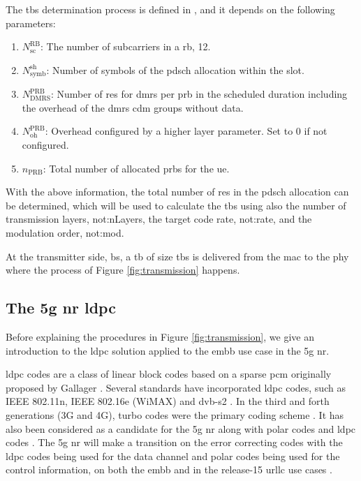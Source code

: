 The \gls{tbs} determination process is defined in \cite[Section 5.1.3.2]{3gpp.38.214}, and it depends on the following parameters:

\begin{enumerate}
    \item $N_{\text{sc}}^{\text{RB}}$: The number of subcarriers in a \gls{rb}, 12.
    \item $N_{\text{symb}}^{\text{sh}}$: Number of symbols of the \gls{pdsch} allocation within the slot.
    \item $N_{\text{DMRS}}^{\text{PRB}}$: Number of \glspl{re} for \gls{dmrs} per \gls{prb} in the scheduled duration including the overhead of the \gls{dmrs} \gls{cdm} groups without data.
    \item $N_{\text{oh}}^{\text{PRB}}$: Overhead configured by a higher layer parameter. Set to 0 if not configured.
    \item $n_{\text{PRB}}$: Total number of allocated \glspl{prb} for the \gls{ue}.
\end{enumerate}

With the above information, the total number of \glspl{re} in the \gls{pdsch} allocation can be determined, which will be used to calculate the \gls{tbs} using also the number of transmission layers, \gls{not:nLayers}, the target code rate, \gls{not:rate}, and the modulation order, \gls{not:mod}.

At the transmitter side, \gls{bs}, a \gls{tb} of size \gls{tbs} is delivered from the \gls{mac} to the \gls{phy} where the process of Figure \ref{fig:transmission} happens.



\subsection{The \gls{5g} \gls{nr} \gls{ldpc}}
\label{subsec:ldpc}

Before explaining the procedures in Figure \ref{fig:transmission}, we give an introduction to the \gls{ldpc} solution applied to the \gls{embb} use case in the \gls{5g} \gls{nr}.
%

\Gls{ldpc} codes are a class of linear block codes based on a sparse \gls{pcm}  originally proposed by Gallager \cite{gallager1962}.
%
Several standards have incorporated \gls{ldpc} codes, such as IEEE 802.11n, IEEE 802.16e (WiMAX) and \gls{dvb-s2} \cite{AliZaidi632018}.
%
In the third and forth generations (3G and 4G), turbo codes were the primary coding scheme \cite{Richardson2018}.
%
It has also been considered as a candidate for the \gls{5g} \gls{nr} along with polar codes and \gls{ldpc} codes \cite{Hamidi8417496}.
%
The \gls{5g} \gls{nr} will make a transition on the error correcting codes with the \gls{ldpc} codes being used for the data channel and polar codes being used for the control information, on both the \gls{embb} and in the release-15 \gls{urllc} use cases \cite{bae_abotabl_lin_song_lee_2019}.

